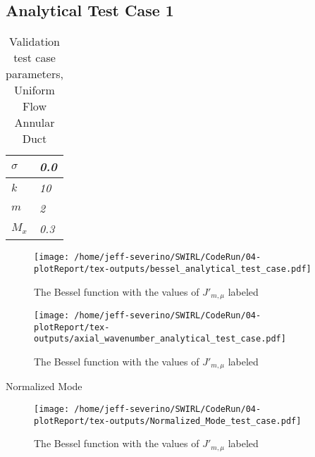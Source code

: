 \begin{frame}
\section{Analytical Test Case 1}
\begin{table}[h!]
    \centering
    \begin{tabular}{|l|l|}
        \hline
        $\sigma$ & \textit{0.0} \\ \hline
        $k$      & \textit{10}   \\ \hline
        $m$      & \textit{2}    \\ \hline
        $M_x$    & \textit{0.3}  \\ \hline
    \end{tabular}
    \caption{Validation test case parameters, Uniform Flow Annular Duct} 
\end{table}

\end{frame}

\begin{frame}
    
 \begin{figure}
     \centering
     \texttt{[image: /home/jeff-severino/SWIRL/CodeRun/04-plotReport/tex-outputs/bessel\_analytical\_test\_case.pdf]}
     \caption{The Bessel function with the values of $J'_{m,\mu}$ labeled}
     \label{fig:decaying_mode_with_1_percent_amp}
 \end{figure}
\end{frame}



\begin{frame}
    
 \begin{figure}
     \centering
     \texttt{[image: /home/jeff-severino/SWIRL/CodeRun/04-plotReport/tex-outputs/axial\_wavenumber\_analytical\_test\_case.pdf]}
     \caption{The Bessel function with the values of $J'_{m,\mu}$ labeled}
     \label{fig:decaying_mode_with_1_percent_amp}
 \end{figure}
\end{frame}


\begin{frame}{Normalized Mode}

    
 \begin{figure}
     \centering
     \texttt{[image: /home/jeff-severino/SWIRL/CodeRun/04-plotReport/tex-outputs/Normalized\_Mode\_test\_case.pdf]}
     \caption{The Bessel function with the values of $J'_{m,\mu}$ labeled}
     \label{fig:decaying_mode_with_1_percent_amp}
 \end{figure}
\end{frame}
\begin{frame}
    
\end{frame}





